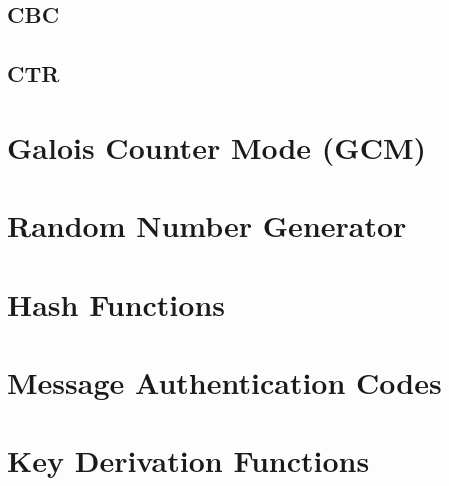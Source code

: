 \documentclass[11pt,a4paper]{report}
\theoremstyle{definitionstyle}
\begin{document}
\subsection{CBC}

\subsection{CTR}

\newpage
\section{Galois Counter Mode (GCM)}


\newpage
\section{Random Number Generator}

\section{Hash Functions}

\section{Message Authentication Codes}

\section{Key Derivation Functions}
\end{document}
